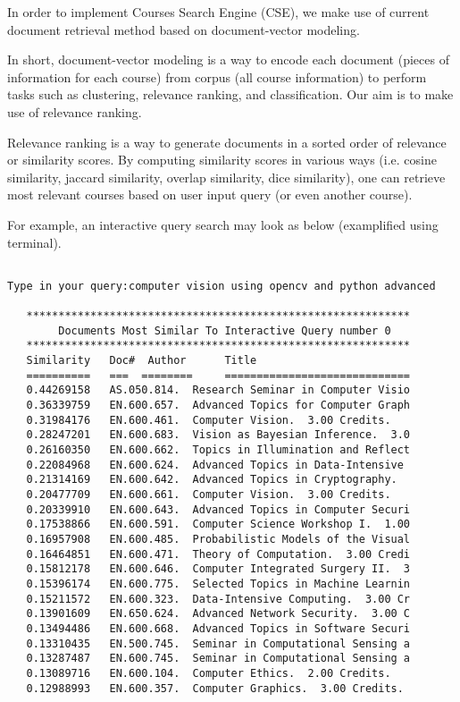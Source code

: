 \documentclass[twoside]{article}
\begin{document}
In order to implement Courses Search Engine (CSE), we make use of current document retrieval method based on document-vector modeling.

In short, document-vector modeling is a way to encode each document (pieces of information for each course) from corpus (all course information) to perform tasks such as clustering, relevance ranking, and classification. Our aim is to make use of relevance ranking.

Relevance ranking is a way to generate documents in a sorted order of relevance or similarity scores. By computing similarity scores in various ways (i.e. cosine similarity, jaccard similarity, overlap similarity, dice similarity), one can retrieve most relevant courses based on user input query (or even another course).

For example, an interactive query search may look as below (examplified using terminal).

\begin{verbatim}

Type in your query:computer vision using opencv and python advanced

   ************************************************************
        Documents Most Similar To Interactive Query number 0       
   ************************************************************
   Similarity   Doc#  Author      Title                        
   ==========   ===  ========     =============================
   0.44269158   AS.050.814.  Research Seminar in Computer Visio
   0.36339759   EN.600.657.  Advanced Topics for Computer Graph
   0.31984176   EN.600.461.  Computer Vision.  3.00 Credits.
   0.28247201   EN.600.683.  Vision as Bayesian Inference.  3.0
   0.26160350   EN.600.662.  Topics in Illumination and Reflect
   0.22084968   EN.600.624.  Advanced Topics in Data-Intensive 
   0.21314169   EN.600.642.  Advanced Topics in Cryptography.  
   0.20477709   EN.600.661.  Computer Vision.  3.00 Credits.
   0.20339910   EN.600.643.  Advanced Topics in Computer Securi
   0.17538866   EN.600.591.  Computer Science Workshop I.  1.00
   0.16957908   EN.600.485.  Probabilistic Models of the Visual
   0.16464851   EN.600.471.  Theory of Computation.  3.00 Credi
   0.15812178   EN.600.646.  Computer Integrated Surgery II.  3
   0.15396174   EN.600.775.  Selected Topics in Machine Learnin
   0.15211572   EN.600.323.  Data-Intensive Computing.  3.00 Cr
   0.13901609   EN.650.624.  Advanced Network Security.  3.00 C
   0.13494486   EN.600.668.  Advanced Topics in Software Securi
   0.13310435   EN.500.745.  Seminar in Computational Sensing a
   0.13287487   EN.600.745.  Seminar in Computational Sensing a
   0.13089716   EN.600.104.  Computer Ethics.  2.00 Credits.
   0.12988993   EN.600.357.  Computer Graphics.  3.00 Credits.

\end{verbatim}
\end{document}
